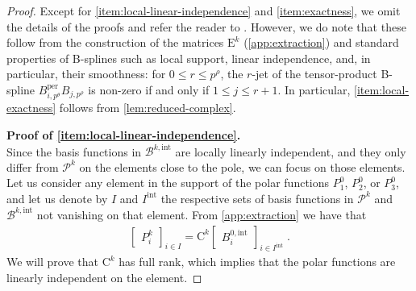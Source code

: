 \documentclass[10pt]{article}
\newcommand{\mbf}[1]{{\boldsymbol{#1}}}
\newcommand{\basis}[1]{\mathcal{#1}}
\newcommand{\mat}[1]{\mbf{\mathrm{#1}}}
\newcommand{\cU}{\theta}
\newcommand{\cV}{\rho}
\newcommand{\degU}{p^\cU}
\newcommand{\degV}{p^\cV}
\newcommand{\bsp}{B}
\newcommand{\bspB}{\basis{\bsp}}
\newcommand{\per}{\mathrm{per}}
\newcommand{\polar}{P}
\newcommand{\polarB}{\basis{\polar}}
\newcommand{\tint}{\mathrm{int}}
\theoremstyle{plain}
\theoremstyle{definition}
\theoremstyle{remark}
\begin{document}
\begin{proof}
    Except for \cref{item:local-linear-independence} and \cref{item:exactness}, we omit the details of the proofs and refer the reader to \cite{Toshniwal:2021}.
    However, we do note that these follow from the construction of the matrices $\mat{E}^{k}$ (\cref{app:extraction}) and standard properties of B-splines such as local support, linear independence, and, in particular, their smoothness: for $0 \leq r \leq \degV$, the $r$-jet of the tensor-product B-spline $\bsp_{i,\degU}^\per\bsp_{j,\degV}$ is non-zero if and only if $1 \leq j \leq r+1$.
    In particular, \cref{item:local-exactness} follows from \cref{lem:reduced-complex}.

    \noindent
    \textbf{Proof of \cref{item:local-linear-independence}.}\\
		Since the basis functions in $\bspB^{k,\tint}$ are locally linearly independent, and they only differ from $\polarB^k$ on the elements close to the pole, we can focus on those elements. Let us consider any element in the support of the polar functions $\polar^0_1$, $\polar^0_2$, or $\polar^0_3$, and let us denote by $I$ and $I^\tint$ the respective sets of basis functions in $\polarB^k$ and $\bspB^{k,\tint}$ not vanishing on that element. From \cref{app:extraction} we have that
	    \begin{equation*}
			\begin{split}
				\begin{bmatrix}
					\polar^k_i
				\end{bmatrix}_{i \in {I}} = \mat{C}^k
				\begin{bmatrix}
					\bsp^{0,\tint}_i
				\end{bmatrix}_{i \in {I}^\tint}\;.
			\end{split}
		\end{equation*}
		We will prove that $\mat{C}^k$ has full rank, which implies  that the polar functions are linearly independent on the element.
		 

\end{proof}
\end{document}
